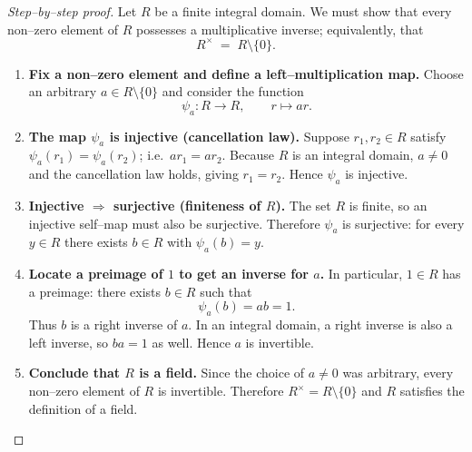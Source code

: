 \documentclass[12pt]{article}
\theoremstyle{definition} %
\theoremstyle{plain} %
\begin{document}
      \begin{proof}[Step--by--step proof]
      Let \(R\) be a finite integral domain.  
      We must show that every non--zero element of \(R\) possesses a multiplicative inverse; equivalently, that
      \[
      R^{\times}\;=\;R\setminus\{0\}.
      \]
      
      \begin{enumerate}
        \item\label{step:def-map}
              \textbf{Fix a non--zero element and define a left--multiplication map.}  
              Choose an arbitrary \(a\in R\setminus\{0\}\) and consider the function
              \[
                \psi_a : R \longrightarrow R,\qquad
                r \longmapsto ar .
              \]
        \item\label{step:inj}
              \textbf{The map \(\psi_a\) is injective (cancellation law).}  
              Suppose \(r_1,r_2\in R\) satisfy \(\psi_a(r_1)=\psi_a(r_2)\); i.e.\ \(ar_1=ar_2\).  
              Because \(R\) is an integral domain, \(a\neq0\) and the cancellation law holds, giving \(r_1=r_2\).  
              Hence \(\psi_a\) is injective.
      
        \item\label{step:surj}
              \textbf{Injective \(\Rightarrow\) surjective (finiteness of \(R\)).}  
              The set \(R\) is finite, so an injective self--map must also be surjective.  
              Therefore \(\psi_a\) is surjective: for every \(y\in R\) there exists \(b\in R\) with \(\psi_a(b)=y\).
      
        \item\label{step:inverse}
              \textbf{Locate a preimage of \(1\) to get an inverse for \(a\).}  
              In particular, \(1\in R\) has a preimage: there exists \(b\in R\) such that
              \[
                \psi_a(b)=ab = 1 .
              \]
              Thus \(b\) is a right inverse of \(a\).  In an integral domain, a right inverse is also a left inverse, so \(ba=1\) as well.  
              Hence \(a\) is invertible.
      
        \item\label{step:conclude}
              \textbf{Conclude that \(R\) is a field.}  
              Since the choice of \(a\neq0\) was arbitrary, every non--zero element of \(R\) is invertible.  
              Therefore \(R^{\times}=R\setminus\{0\}\) and \(R\) satisfies the definition of a field.
              \qedhere
      \end{enumerate}
      \end{proof}
\end{document}
